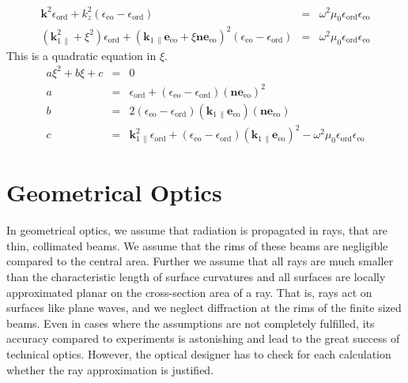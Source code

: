 \documentclass[12pt,a4paper,twoside,openright,BCOR10mm,headsepline,titlepage,abstracton,chapterprefix,final]{scrreprt}
\newcommand\Vector[1]{{\mathbf{#1}}}
\newcommand\vacuum{0}
\newcommand\wavenumber{k}
\newcommand\Wavevector{\Vector{\wavenumber}}
\newcommand\vacuumpermeability{\mu_{\vacuum}}
\newcommand\scalarpermittivity{\epsilon}
\newcommand\ordi{\text{ord}}
\newcommand\eo{\text{eo}}
\begin{document}
\begin{eqnarray}
 \Wavevector^2 \scalarpermittivity_{\ordi} 
 + \wavenumber_{z}^2 (\scalarpermittivity_{\eo} - \scalarpermittivity_{\ordi})
 &=& \omega^2 \vacuumpermeability \scalarpermittivity_{\ordi} \scalarpermittivity_{\eo} 
 \\
 (\Wavevector_{1\,\parallel}^2 + \xi^2) \scalarpermittivity_{\ordi} 
 + (\Wavevector_{1\,\parallel} \Vector{e}_{\eo} + \xi \Vector{n}\Vector{e}_{\eo})^2 (\scalarpermittivity_{\eo} - \scalarpermittivity_{\ordi})
 &=& \omega^2 \vacuumpermeability \scalarpermittivity_{\ordi} \scalarpermittivity_{\eo}  
\end{eqnarray}
This is a quadratic equation in $\xi$.
\begin{eqnarray}
 a \xi^2 + b \xi + c &=& 0
 \\
 a &=& \scalarpermittivity_{\ordi} + (\scalarpermittivity_{\eo} - \scalarpermittivity_{\ordi}) (\Vector{n}\Vector{e}_{\eo})^2
 \nonumber 
 \\
 b &=& 2 (\scalarpermittivity_{\eo} - \scalarpermittivity_{\ordi}) (\Wavevector_{1\,\parallel} \Vector{e}_{\eo}) (\Vector{n}\Vector{e}_{\eo})
 \nonumber 
 \\
 c &=& \Wavevector_{1\,\parallel}^2 \scalarpermittivity_{\ordi} + (\scalarpermittivity_{\eo} - \scalarpermittivity_{\ordi}) (\Wavevector_{1\,\parallel} \Vector{e}_{\eo})^2 
       - \omega^2 \vacuumpermeability \scalarpermittivity_{\ordi} \scalarpermittivity_{\eo} 
 \nonumber
\end{eqnarray}





\chapter{Geometrical Optics}
In geometrical optics, we assume that radiation is propagated in rays, that are thin, collimated beams. 
We assume that the rims of these beams are negligible compared to the central area. 
Further we assume that all rays are much smaller than the characteristic length of surface curvatures and 
all surfaces are locally approximated planar on the cross-section area of a ray.
That is, rays act on surfaces like plane waves, and we neglect diffraction at the rims of the finite sized beams.
Even in cases where the assumptions are not completely fulfilled, its accuracy compared to experiments is 
astonishing and lead to the great success of technical optics.
However, the optical designer has to check for each calculation whether the ray approximation is justified.
\end{document}
